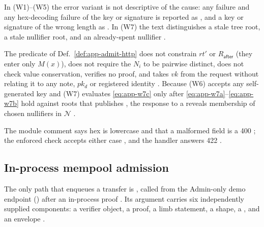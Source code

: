 In (W1)--(W5) the error variant is not descriptive of the cause: any
 failure and any hex-decoding failure of the key or signature
is reported as , and a key or signature of the wrong
length as 
. In (W7) the  text
distinguishes a stale tree root, a stale nullifier root, and an already-spent
nullifier .

\begin{property}
\label{prop:app-http-gaps}
The predicate of Def.~\ref{def:app-admit-http} does not constrain $rt'$ or
$R_{\mathsf{after}}$ (they enter only $M(x)$), does not require the $N_i$ to
be pairwise distinct, does not check value conservation, verifies no proof,
and takes $vk$ from the request without relating it to any note,
$pk_d$ or registered identity . Because (W6) accepts any
self-generated key and (W7) evaluates \eqref{eq:app-w7c} only after
\eqref{eq:app-w7a}--\eqref{eq:app-w7b} hold against roots that
 publishes , the
response to a  reveals membership of chosen nullifiers in
$\mathcal{N}$ .
\end{property}

\begin{specdelta}
\label{delta:app-wire}
The module comment says hex is lowercase and that a malformed field is a 400
; the enforced check accepts either case
, and the handler answers 422
.
\end{specdelta}

\subsection{In-process mempool admission}
\label{subsec:app-seq}

The only path that enqueues a transfer is , called
from the Admin-only demo endpoint () after an
in-process proof 
. Its argument
 carries six independently supplied components: a verifier
object, a proof, a limb statement, a shape, a , and an
envelope .

